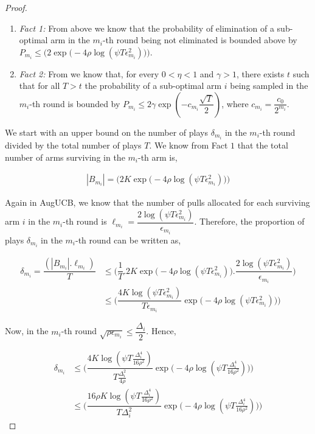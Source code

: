 \begin{proof}
\begin{enumerate}
\item \emph{Fact 1:} From above we know that the probability of elimination of a sub-optimal arm in the $m_{i}$-th round being not eliminated is bounded above by $P_{m_{i}}\leq\bigg(2\exp\big(-4\rho\log (\psi T\epsilon_{m_{i}}^{2})\big)\bigg)$.
\item \emph{Fact 2:} From \cite{tolpin2012mcts} we know that, for every $0<\eta <1$ and $\gamma > 1$, there exists $t$ such that for all $T>t$ the probability of a sub-optimal arm $i$ being sampled in the $m_{i}$-th round is bounded by $P_{m_{i}}\leq 2\gamma \exp(-c_{m_{i}}\dfrac{\sqrt{T}}{2})$, where $c_{m_{i}}=\dfrac{c_{0}}{2^{m_{i}}}$.
\end{enumerate}

We start with an upper bound on the number of plays $\delta_{m_{i}}$ in the $m_{i}$-th round divided by the total number of plays $T$. We know  from Fact $1$  that the total number of arms surviving in the $m_{i}$-th arm is, 

\begin{align*}
|B_{m_{i}}|=\bigg(2K\exp\big(-4\rho\log (\psi T\epsilon_{m_{i}}^{2})\big)\bigg) 
\end{align*}     

Again in AugUCB, we know that the number of pulls allocated for each surviving arm $i$ in the $m_{i}$-th round is $\ell_{m_{i}}=\dfrac{2\log (\psi T \epsilon_{m_{i}}^{2})}{\epsilon_{m_{i}}}$. Therefore, the proportion of plays $\delta_{m_{i}}$ in the $m_{i}$-th round can be written as,

\begin{align*}
\delta_{m_{i}}=\dfrac{(|B_{m_{i}}|.\ell_{m_{i}})}{T} &\leq \bigg(\dfrac{1}{T}.2K\exp\big(-4\rho\log (\psi T\epsilon_{m_{i}}^{2})\big).\dfrac{2\log (\psi T \epsilon_{m_{i}}^{2})}{\epsilon_{m_{i}}}\bigg)\\
& \leq \bigg(\dfrac{4K\log (\psi T \epsilon_{m_{i}}^{2})}{T\epsilon_{m_{i}}}\exp\big(-4\rho\log (\psi T\epsilon_{m_{i}}^{2})\big)\bigg)
\end{align*}

Now, in the $m_{i}$-th round $\sqrt{\rho\epsilon_{m_{i}}}\leq \dfrac{\Delta_{i}}{2}$. Hence,

\begin{align*}
\delta_{m_{i}}& \leq \bigg(\dfrac{4K\log (\psi T \frac{\Delta_{i}^{4}}{16\rho^{2}})}{T\frac{\Delta_{i}^{2}}{4\rho}}\exp\big(-4\rho\log (\psi T\frac{\Delta_{i}^{4}}{16\rho^{2}})\big)\bigg)\\
&\leq \bigg(\dfrac{16\rho K\log (\psi T \frac{\Delta_{i}^{4}}{16\rho^{2}})}{T\Delta_{i}^{2}}\exp\big(-4\rho\log (\psi T\frac{\Delta_{i}^{4}}{16\rho^{2}})\big)\bigg)
\end{align*}


\end{proof}
